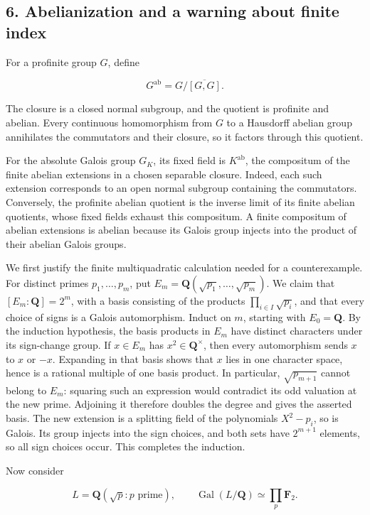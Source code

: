 \documentclass[11pt,a4paper]{article}
\begin{document}
\subsection{6. Abelianization and a warning about finite
index}\label{abelianization-and-a-warning-about-finite-index}

For a profinite group \(G\), define

\[
G^{\mathrm{ab}}=G/\overline{[G,G]}.
\]

The closure is a closed normal subgroup, and the quotient is profinite
and abelian. Every continuous homomorphism from \(G\) to a Hausdorff
abelian group annihilates the commutators and their closure, so it
factors through this quotient.

For the absolute Galois group \(G_K\), its fixed field is
\(K^{\mathrm{ab}}\), the compositum of the finite abelian extensions in
a chosen separable closure. Indeed, each such extension corresponds to
an open normal subgroup containing the commutators. Conversely, the
profinite abelian quotient is the inverse limit of its finite abelian
quotients, whose fixed fields exhaust this compositum. A finite
compositum of abelian extensions is abelian because its Galois group
injects into the product of their abelian Galois groups.

We first justify the finite multiquadratic calculation needed for a
counterexample. For distinct primes \(p_1,\ldots,p_m\), put
\(E_m=\mathbf Q(\sqrt{p_1},\ldots,\sqrt{p_m})\). We claim that
\([E_m:\mathbf Q]=2^m\), with a basis consisting of the products
\(\prod_{i\in I}\sqrt{p_i}\), and that every choice of signs is a Galois
automorphism. Induct on \(m\), starting with \(E_0=\mathbf Q\). By the
induction hypothesis, the basis products in \(E_m\) have distinct
characters under its sign-change group. If \(x\in E_m\) has
\(x^2\in\mathbf Q^\times\), then every automorphism sends \(x\) to \(x\)
or \(-x\). Expanding in that basis shows that \(x\) lies in one
character space, hence is a rational multiple of one basis product. In
particular, \(\sqrt{p_{m+1}}\) cannot belong to \(E_m\): squaring such
an expression would contradict its odd valuation at the new prime.
Adjoining it therefore doubles the degree and gives the asserted basis.
The new extension is a splitting field of the polynomials \(X^2-p_i\),
so is Galois. Its group injects into the sign choices, and both sets
have \(2^{m+1}\) elements, so all sign choices occur. This completes the
induction.

Now consider

\[
L=\mathbf Q(\sqrt p:p\text{ prime}),
\qquad \operatorname{Gal}(L/\mathbf Q)\simeq\prod_p\mathbf F_2.
\]
\end{document}
